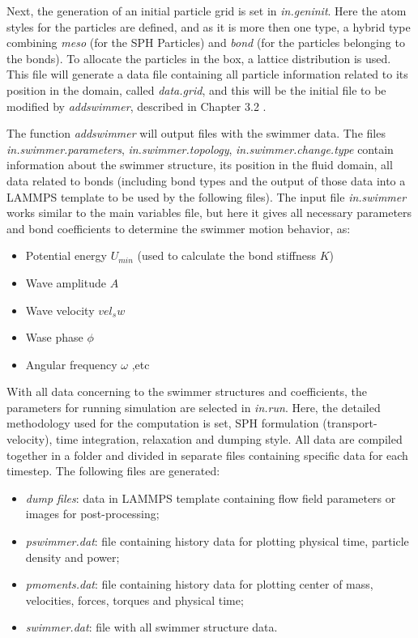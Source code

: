 Next, the generation of an initial particle grid is set in \textit{in.geninit}. Here the atom styles for the particles are defined, and as it is more then one type, a hybrid type
combining \textit{meso} (for the SPH Particles) and \textit{bond} (for the particles belonging to the bonds). To allocate the particles in the box, a lattice distribution is used.
This file will generate a data file containing all particle information related to its position in the domain, called \textit{data.grid}, and this will be the initial file to be 
modified by \textit{addswimmer}, described in Chapter 3.2 . \par
The function \textit{addswimmer} will output files with the swimmer data. The files \textit{in.swimmer.parameters}, \textit{in.swimmer.topology}, \textit{in.swimmer.change.type}
contain information about the swimmer structure, its position in the fluid domain, all data related to bonds (including bond types and the  output of those data into a LAMMPS
template to be used by the following files). The input file \textit{in.swimmer} works similar to the main variables file, but here it gives all necessary parameters and bond
coefficients to determine the swimmer motion behavior, as:

\begin{itemize}
  \item Potential energy $U_{min}$ (used to calculate the bond stiffness $K$)
  \item Wave amplitude $A$ 
  \item Wave velocity $vel_sw$
  \item Wase phase $\phi$
  \item Angular frequency $\omega$ ,etc
\end{itemize}

With all data concerning to the swimmer structures and coefficients, the parameters for running simulation are selected in \textit{in.run}. Here, the detailed methodology used
for the computation is set, SPH formulation (transport-velocity), time integration, relaxation and dumping style. All data are compiled together in a folder and divided in 
separate files containing specific data for each timestep. The following files are generated:

\begin{itemize}
  \item \textit{dump files}: data in LAMMPS template containing flow field parameters or images for post-processing; 
  \item \textit{pswimmer.dat}: file containing history data for plotting physical time, particle density and power;  
  \item \textit{pmoments.dat}: file containing history data for plotting center of mass, velocities, forces, torques and physical time; 
  \item \textit{swimmer.dat}: file with all swimmer structure data.
\end{itemize}


